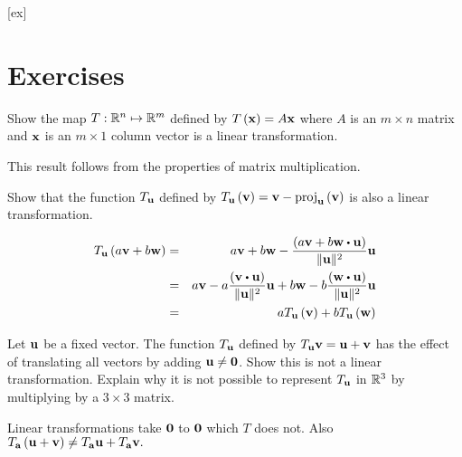 [ex]
\section*{Exercises}

\begin{enumialphparenastyle}

\begin{ex} Show the map $T:\mathbb{R}^{n}\mapsto \mathbb{R}^{m}$ defined by 
$T\left({\bf x} \right) =A{\bf x}$ where $A$ is an $m\times n$ matrix
and ${\bf x}$ is an $m\times 1$ column vector is a linear transformation. 
\begin{sol}
This result follows from the properties of matrix multiplication.
\end{sol}
\end{ex}

\begin{ex} Show that the function $T_{{\bf u}}$ defined by $T_{{\bf u}}
\left({\bf v}\right) = {\bf v}-\mbox{proj}_{{\bf u}}\left(
{\bf v}\right) $ is also a linear transformation.
\begin{sol}
\begin{eqnarray*}
T_{\vect{u}}\tup{a\vect{v}+b\vect{w}} &=&a\vect{v}+b\vect{w}-\frac{\tup{a\vect{v}+b\vect{w}\dotprod \vect{u}} }{\vectlength \vect{u}
\vectlength ^{2}}\vect{u} \\
&=&a\vect{v}-a\frac{\tup{\vect{v}\dotprod \vect{u}} }{\vectlength \vect{u} \vectlength ^{2}}\vect{u}+b\vect{w}-b\frac{\tup{\vect{w}\dotprod \vect{u}
} }{\vectlength \vect{u}\vectlength ^{2}}\vect{u} \\
&=&aT_{\vect{u}}\tup{\vect{v}} +bT_{\vect{u}}\tup{\vect{w}
}
\end{eqnarray*}
\end{sol}
\end{ex}

\begin{ex} Let ${\bf u}$ be a fixed vector. The function 
$T_{{\bf u}}$ defined by $T_{{\bf u}}{\bf v}={\bf u}+{\bf v}$ has the effect of
translating all vectors by adding ${\bf u}\neq {\bf 0}$. Show this is not a
linear transformation. Explain why it is not possible to represent 
$T_{{\bf u}}$ in $\mathbb{R}^{3}$ by multiplying by a $3\times 3$ matrix.
\begin{sol}
Linear
transformations take ${\bf 0}$ to ${\bf 0}$ which $T$ does not. Also $T_{{\bf a}}\left({\bf u}+{\bf v}\right) \neq T_{{\bf a}}{\bf u}+T_{{\bf a}}
{\bf v}.$
\end{sol}
\end{ex}

\end{enumialphparenastyle}